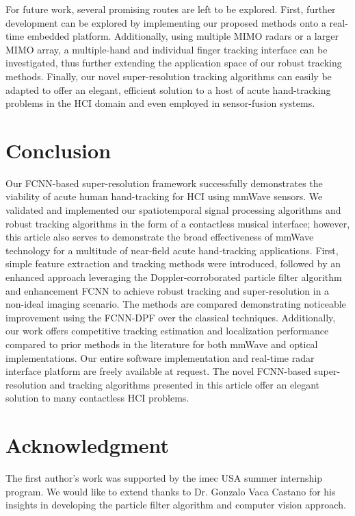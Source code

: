 \documentclass[10pt,journal,final]{IEEEtran}
\begin{document}
For future work, several promising routes are left to be explored. 
First, further development can be explored by implementing our proposed methods onto a real-time embedded platform.
Additionally, using multiple MIMO radars or a larger MIMO array, a multiple-hand and individual finger tracking interface can be investigated, thus further extending the application space of our robust tracking methods.
Finally, our novel super-resolution tracking algorithms can easily be adapted to offer an elegant, efficient solution to a host of acute hand-tracking problems in the HCI domain and even employed in sensor-fusion systems. 

\section{Conclusion}
\label{sec:conclusion}

Our FCNN-based super-resolution framework successfully demonstrates the viability of acute human hand-tracking for HCI using mmWave sensors. 
We validated and implemented our spatiotemporal signal processing algorithms and robust tracking algorithms in the form of a contactless musical interface; however, this article also serves to demonstrate the broad effectiveness of mmWave technology for a multitude of near-field acute hand-tracking applications. 
First, simple feature extraction and tracking methods were introduced, followed by an enhanced approach leveraging the Doppler-corroborated particle filter algorithm and enhancement FCNN to achieve robust tracking and super-resolution in a non-ideal imaging scenario. %
The methods are compared demonstrating noticeable improvement using the FCNN-DPF over the classical techniques.
Additionally, our work offers competitive tracking estimation and localization performance compared to prior methods in the literature for both mmWave and optical implementations. 
Our entire software implementation and real-time radar interface platform are freely available at request.
The novel FCNN-based super-resolution and tracking algorithms presented in this article offer an elegant solution to many contactless HCI problems.

\section*{Acknowledgment}
The first author's work was supported by the imec USA summer internship program. We would like to extend thanks to Dr. Gonzalo Vaca Castano for his insights in developing the particle filter algorithm and computer vision approach.



\end{document}
